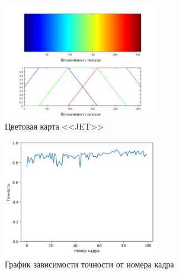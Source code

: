 \documentclass[t]{beamer}
\begin{document}
	\begin{frame}[noframenumbering]
			\vspace*{0.7cm}
				\vspace*{0.7cm}
		\begin{figure}[h!]
			\centering
			\includegraphics[width = 0.6\textwidth]{image/chapter_2/jet}
			\caption{Цветовая карта <<JET>>}
			\label{fig:jet}	
		\end{figure}
	\end{frame}

\appendix

\begin{frame}[noframenumbering]
		\vspace*{0.7cm}
	\begin{figure}[h!]
		\centering
		\includegraphics[width = 0.6\textwidth]{image/accuracy_itog_plot}
		\caption{График зависимости точности от номера кадра}
		\label{fig:accuracy_itog_plot}	
	\end{figure}
\end{frame}

\appendix
\end{document}
